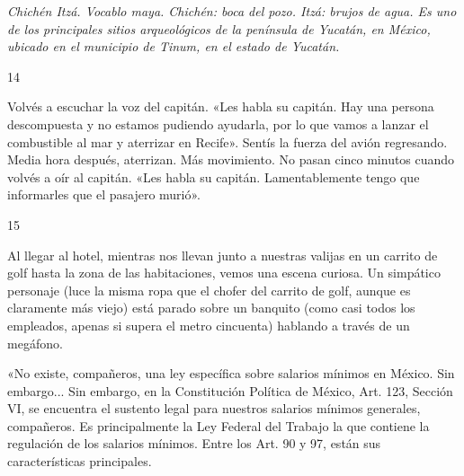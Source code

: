 \documentclass[12pt,twoside,openright,a5paper]{book}
\begin{document}
\nopagebreak

\emph{Chichén Itzá. Vocablo maya. Chichén: \emph{boca del pozo}. Itzá: \emph{brujos de agua}.
Es uno de los principales sitios arqueológicos de la península de Yucatán,
en México, ubicado en el municipio de Tinum, en el estado de Yucatán.}

\vspace{0.5cm}
\afterpage{}
\hrulefill \hspace{0.1cm}\decofourleft\hspace{0.2cm} 14 \hspace{0.2cm}\decofourright \hspace{0.1cm}\hrulefill

\nopagebreak

\vspace{0.5cm}

\nopagebreak

Volvés a escuchar la voz del capitán. «Les habla su capitán. Hay una
persona descompuesta y no estamos pudiendo ayudarla, por lo que vamos a
lanzar el combustible al mar y aterrizar en Recife». Sentís la fuerza del
avión regresando. Media hora después, aterrizan. Más movimiento. No pasan
cinco minutos cuando volvés a oír al capitán. «Les habla su capitán.
Lamentablemente tengo que informarles que el pasajero murió».

\vspace{0.5cm}

\hrulefill \hspace{0.1cm}\decofourleft\hspace{0.2cm} 15 \hspace{0.2cm}\decofourright \hspace{0.1cm}\hrulefill

\nopagebreak

\vspace{0.5cm}

\nopagebreak


Al llegar al hotel,
mientras nos llevan junto a nuestras valijas en un carrito de golf hasta
la zona de las habitaciones, vemos una escena curiosa. Un simpático personaje
(luce la misma ropa que el chofer del carrito de golf, aunque es claramente
más viejo) está parado sobre un banquito (como casi todos los empleados,
apenas si supera el metro cincuenta) hablando a través de un megáfono.

«No existe, compañeros, una ley específica sobre salarios mínimos en
México. Sin embargo... Sin embargo, en la Constitución Política de México,
Art. 123, Sección VI, se encuentra el sustento legal para nuestros
salarios mínimos generales, compañeros. Es principalmente la Ley Federal
del Trabajo la que contiene la regulación de los salarios mínimos.
Entre los Art. 90 y 97, están sus características principales.
\end{document}
